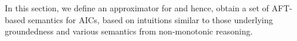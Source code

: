 In this section, we define an approximator for \Op and hence, obtain a set of AFT-based semantics for AICs, based on intuitions similar to those underlying groundedness and various semantics from non-monotonic reasoning. 



% 


